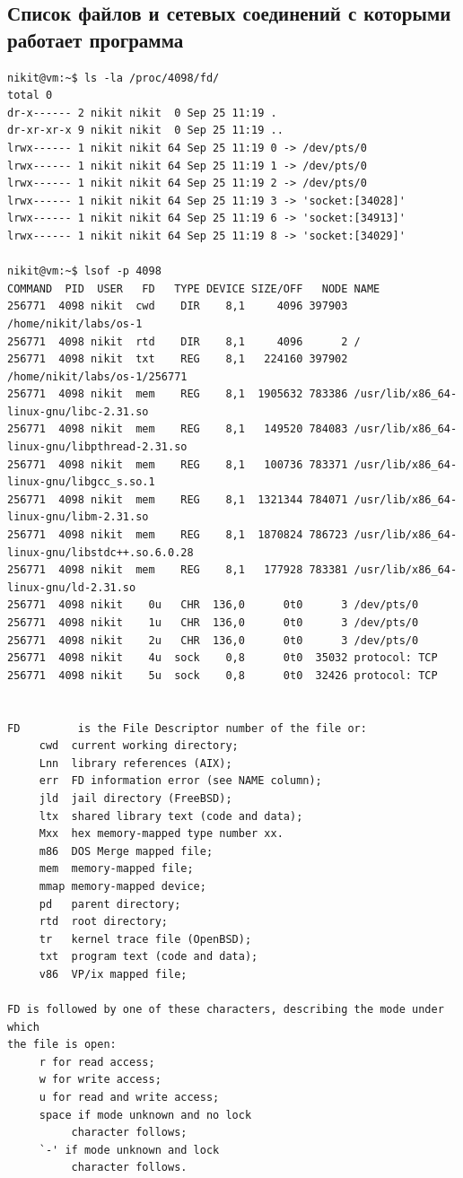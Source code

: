 \documentclass[11pt, a4paper]{article}
\begin{document}
\subsection{Список файлов и сетевых соединений с которыми работает программа}
\begin{Verbatim}[fontsize=\small]
nikit@vm:~$ ls -la /proc/4098/fd/
total 0
dr-x------ 2 nikit nikit  0 Sep 25 11:19 .
dr-xr-xr-x 9 nikit nikit  0 Sep 25 11:19 ..
lrwx------ 1 nikit nikit 64 Sep 25 11:19 0 -> /dev/pts/0
lrwx------ 1 nikit nikit 64 Sep 25 11:19 1 -> /dev/pts/0
lrwx------ 1 nikit nikit 64 Sep 25 11:19 2 -> /dev/pts/0
lrwx------ 1 nikit nikit 64 Sep 25 11:19 3 -> 'socket:[34028]'
lrwx------ 1 nikit nikit 64 Sep 25 11:19 6 -> 'socket:[34913]'
lrwx------ 1 nikit nikit 64 Sep 25 11:19 8 -> 'socket:[34029]'

nikit@vm:~$ lsof -p 4098
COMMAND  PID  USER   FD   TYPE DEVICE SIZE/OFF   NODE NAME
256771  4098 nikit  cwd    DIR    8,1     4096 397903 /home/nikit/labs/os-1
256771  4098 nikit  rtd    DIR    8,1     4096      2 /
256771  4098 nikit  txt    REG    8,1   224160 397902 /home/nikit/labs/os-1/256771
256771  4098 nikit  mem    REG    8,1  1905632 783386 /usr/lib/x86_64-linux-gnu/libc-2.31.so
256771  4098 nikit  mem    REG    8,1   149520 784083 /usr/lib/x86_64-linux-gnu/libpthread-2.31.so
256771  4098 nikit  mem    REG    8,1   100736 783371 /usr/lib/x86_64-linux-gnu/libgcc_s.so.1
256771  4098 nikit  mem    REG    8,1  1321344 784071 /usr/lib/x86_64-linux-gnu/libm-2.31.so
256771  4098 nikit  mem    REG    8,1  1870824 786723 /usr/lib/x86_64-linux-gnu/libstdc++.so.6.0.28
256771  4098 nikit  mem    REG    8,1   177928 783381 /usr/lib/x86_64-linux-gnu/ld-2.31.so
256771  4098 nikit    0u   CHR  136,0      0t0      3 /dev/pts/0
256771  4098 nikit    1u   CHR  136,0      0t0      3 /dev/pts/0
256771  4098 nikit    2u   CHR  136,0      0t0      3 /dev/pts/0
256771  4098 nikit    4u  sock    0,8      0t0  35032 protocol: TCP
256771  4098 nikit    5u  sock    0,8      0t0  32426 protocol: TCP


FD         is the File Descriptor number of the file or:
     cwd  current working directory;
     Lnn  library references (AIX);
     err  FD information error (see NAME column);
     jld  jail directory (FreeBSD);
     ltx  shared library text (code and data);
     Mxx  hex memory-mapped type number xx.
     m86  DOS Merge mapped file;
     mem  memory-mapped file;
     mmap memory-mapped device;
     pd   parent directory;
     rtd  root directory;
     tr   kernel trace file (OpenBSD);
     txt  program text (code and data);
     v86  VP/ix mapped file;

FD is followed by one of these characters, describing the mode under  which
the file is open:
     r for read access;
     w for write access;
     u for read and write access;
     space if mode unknown and no lock
          character follows;
     `-' if mode unknown and lock
          character follows.
\end{Verbatim}
\end{document}
